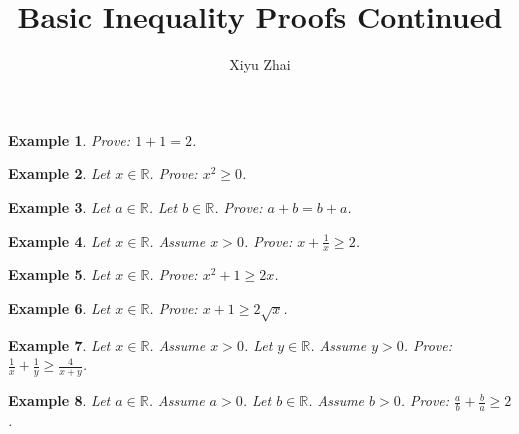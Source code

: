 \documentclass{article}
\newtheorem{example}{Example}
\begin{document}
\title{Basic Inequality Proofs Continued}
\author{Xiyu Zhai}
\maketitle

\begin{example}
    Prove: $1+1=2$.
\end{example}


\begin{example}
    Let $x\in\mathbb{R}$. Prove: $x^2\ge 0$.
\end{example}

\begin{example}
    Let $a\in\mathbb{R}$. Let $b\in\mathbb{R}$. Prove: $a+b=b+a$.
\end{example}

\begin{example}
    Let $x\in\mathbb{R}$. Assume $x> 0$. Prove: $x + \frac{1}{x} \ge 2$.
\end{example}

\begin{example}
    Let $x\in\mathbb{R}$. Prove: $x^2 + 1\ge 2x$.
\end{example}

\begin{example}
    Let $x\in\mathbb{R}$. Prove: $x + 1 \ge 2\sqrt{x}$.
\end{example}

\begin{example}
    Let $x\in\mathbb{R}$. Assume $x>0$.
    Let $y\in\mathbb{R}$. Assume $y>0$.
    Prove: $\frac{1}{x} + \frac{1}{y} \ge \frac{4}{x+y}$.
\end{example}

\begin{example}    Let $a\in\mathbb{R}$. Assume $a > 0$.
    Let $b\in\mathbb{R}$. Assume $b > 0$.
    Prove: $\frac{a}{b} + \frac{b}{a} \ge 2$.
\end{example}
\end{document}
